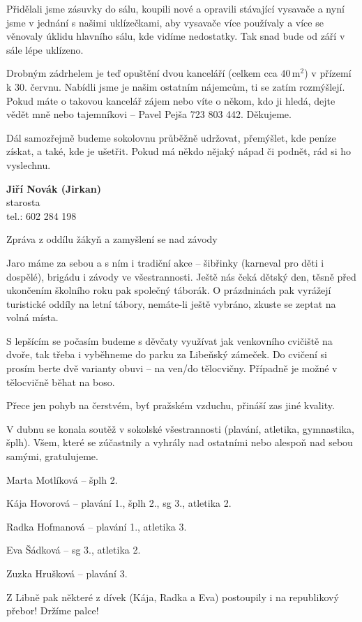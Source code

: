 \documentclass[11pt]{article}
\newcommand{\post}[1]{%
\begin{center}
{\huge \tyrs #1}
\end{center}
}
\newcommand{\signature}[2]{%
  \begin{flushright}
    \textbf{#1}\\#2
  \end{flushright}
}
\begin{document}
Přidělali jsme zásuvky do sálu, koupili nové a opravili stávající vysavače a nyní jsme v jednání s našimi uklízečkami, aby vysavače více používaly a více se věnovaly úklidu hlavního sálu, kde vidíme nedostatky. Tak snad bude od září v sále lépe uklízeno.

Drobným zádrhelem je teď opuštění dvou kanceláří (celkem cca $40\,\textrm{m}^2$) v přízemí k 30. červnu. Nabídli jsme je našim ostatním nájemcům, ti se zatím rozmýšlejí. Pokud máte o takovou kancelář zájem nebo víte o někom, kdo ji hledá, dejte vědět mně nebo tajemníkovi – Pavel Pejša 723 803 442. Děkujeme.

Dál samozřejmě budeme sokolovnu průběžně udržovat, přemýšlet, kde peníze získat, a také, kde je ušetřit. Pokud má někdo nějaký nápad či podnět, rád si ho vyslechnu.

\signature{Jiří Novák (Jirkan)}{starosta\\tel.: 602 284 198}

\vspace*{24pt}

\post{Zpráva z oddílu žákyň a zamyšlení se nad závody}
Jaro máme za sebou a s ním i tradiční akce – šibřinky (karneval pro děti i dospělé), brigádu i závody ve všestrannosti. Ještě nás čeká dětský den, těsně před ukončením školního roku pak společný táborák. O prázdninách pak vyrážejí turistické oddíly na letní tábory, nemáte-li ještě vybráno, zkuste se zeptat na volná místa.

S lepšícím se počasím budeme s děvčaty využívat jak venkovního cvičiště na dvoře, tak třeba i vyběhneme do parku za Libeňský zámeček. Do cvičení si prosím berte dvě varianty obuvi – na ven/do tělocvičny. Případně je možné v tělocvičně běhat na boso. 

Přece jen pohyb na čerstvém, byť pražském vzduchu, přináší zas jiné kvality. 


V dubnu se konala soutěž v sokolské všestrannosti (plavání, atletika, gymnastika, šplh). Všem, které se zúčastnily a vyhrály nad ostatními nebo alespoň nad sebou samými, gratulujeme.

Marta Motlíková – šplh 2.

Kája Hovorová – plavání 1., šplh 2., sg 3., atletika 2.

Radka Hofmanová – plavání 1., atletika 3.

Eva Šádková – sg 3., atletika 2.

Zuzka Hrušková – plavání 3.

Z Libně pak některé z dívek (Kája, Radka a Eva) postoupily i na republikový přebor! Držíme palce!
\end{document}
